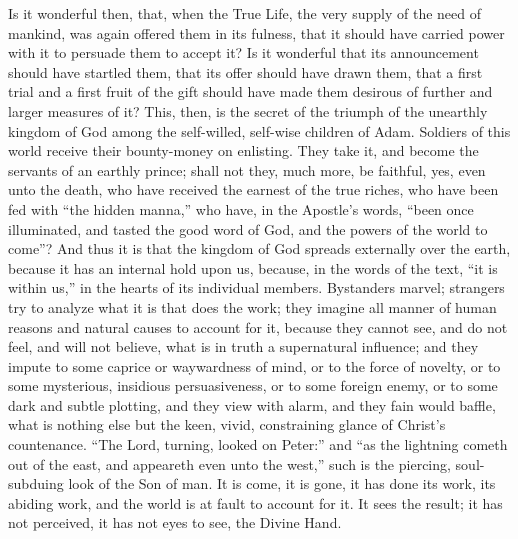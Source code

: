 Is it wonderful then, that, when the True Life, the
very supply of the need of mankind, was again offered
them in its fulness, that it should have carried power
with it to persuade them to accept it? Is it wonderful
that its announcement should have startled them, that its
offer should have drawn them, that a first trial and a
first fruit of the gift should have made them desirous of
further and larger measures of it? This, then, is the
secret of the triumph of the unearthly kingdom of God
among the self-willed, self-wise children of Adam.
Soldiers of this world receive their bounty-money on
enlisting. They take it, and become the servants of an
earthly prince; shall not they, much more, be faithful,
yes, even unto the death, who have received the earnest
of the true riches, who have been fed with ``the
hidden manna,'' who have, in the Apostle's words,
``been once illuminated, and tasted the good word of
God, and the powers of the world to come''? And thus
it is that the kingdom of God spreads externally over the
earth, because it has an internal hold upon us, because,
in the words of the text, ``it is within us,'' in
the hearts of its individual members. Bystanders marvel;
strangers try to analyze what it is that does the work;
they imagine all manner of human reasons and natural
causes to account for it, because they cannot see, and do
not feel, and will not believe, what is in truth a
supernatural influence; and they impute to some caprice
or waywardness of mind, or to the force of novelty, or to
some mysterious, insidious persuasiveness, or to some
foreign enemy, or to some dark and subtle plotting, and
they view with alarm, and they fain would baffle, what is
nothing else but the keen, vivid, constraining glance of
Christ's countenance. ``The Lord, turning, looked on
Peter:'' and ``as the lightning cometh out of the
east, and appeareth even unto the west,'' such is the
piercing, soul-subduing look of the Son of man. It is
come, it is gone, it has done its work, its abiding work,
and the world is at fault to account for it. It sees the
result; it has not perceived, it has not eyes to see, the
Divine Hand.

